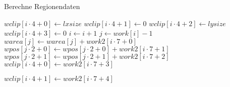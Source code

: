 \begin{algorithm}[ht]
\caption{Berechne Regionendaten}
\label{alg:arlabeling-calcregiondata}
\begin{algorithmic}[1]
	\label{alg:arlabeling-calcregiondata-wclip-start}
		\State $\mathit{wclip}\left[i \cdot 4 + 0\right] \gets \mathit{lxsize}$
		\State $\mathit{wclip}\left[i \cdot 4 + 1\right] \gets 0$
		\State $\mathit{wclip}\left[i \cdot 4 + 2\right] \gets \mathit{lysize}$
		\State $\mathit{wclip}\left[i \cdot 4 + 3\right] \gets 0$
		\State $i \gets i + 1$
	\EndFor
	\label{alg:arlabeling-calcregiondata-wclip-end}
	\label{alg:arlabeling-calcregiondata-work-start}
		\State $j \gets \mathit{work}\left[i\right] - 1$
		\label{alg:arlabeling-calcregiondata-label}
		\State $\mathit{warea}\left[j\right] \gets \mathit{warea}\left[j\right] + \mathit{work2}\left[i \cdot 7 + 0\right]$
		\State $\mathit{wpos}\left[j \cdot 2 + 0\right] \gets \mathit{wpos}\left[j \cdot 2 + 0\right] + \mathit{work2}\left[i \cdot 7 + 1\right]$
		\label{alg:arlabeling-calcregiondata-sumx}
		\State $\mathit{wpos}\left[j \cdot 2 + 1\right] \gets \mathit{wpos}\left[j \cdot 2 + 1\right] + \mathit{work2}\left[i \cdot 7 + 2\right]$
		\label{alg:arlabeling-calcregiondata-sumy}
		\label{alg:arlabeling-calcregiondata-startx-start}
			\State $\mathit{wclip}\left[i \cdot 4 + 0\right] \gets \mathit{work2}\left[i \cdot 7 + 3\right]$
		\EndIf
		\label{alg:arlabeling-calcregiondata-startx-end}

		\label{alg:arlabeling-calcregiondata-starty-start}
			\State $\mathit{wclip}\left[i \cdot 4 + 1\right] \gets \mathit{work2}\left[i \cdot 7 + 4\right]$
		\EndIf
		\label{alg:arlabeling-calcregiondata-starty-end}


\end{algorithmic}
\end{algorithm}
